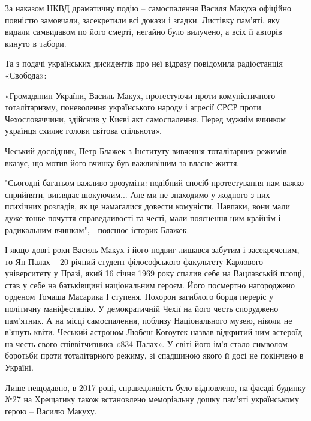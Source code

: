 За наказом НКВД драматичну подію – самоспалення Василя Макуха офіційно повністю
замовчали, засекретили всі докази і згадки. Листівку пам’яті, яку видали
самвидавом по його смерті, негайно було вилучено, а всіх її авторів кинуто в
табори.

Та з подачі українських дисидентів про неї відразу повідомила радіостанція
«Свобода»:

«Громадянин України, Василь Макух, протестуючи проти комуністичного
тоталітаризму, поневолення українського народу і агресії СРСР проти
Чехословаччини, здійснив у Києві акт самоспалення. Перед мужнім вчинком
українця схиляє голови світова спільнота».

Чеський дослідник, Петр Блажек з Інституту вивчення тоталітарних режимів
вказує, що мотив його вчинку був важливішим за власне життя.

"Сьогодні багатьом важливо зрозуміти: подібний спосіб протестування нам важко
сприйняти, виглядає шокуючим... Але ми не знаходимо у жодного з них психічних
розладів, як це намагалися довести комуністи. Навпаки, вони мали дуже тонке
почуття справедливості та честі, мали пояснення цим крайнім і радикальним
вчинкам", - пояснює історик Блажек.

І якщо довгі роки Василь Макух і його подвиг лишався забутим і засекреченим, то
Ян Палах – 20-річний студент філософського факультету Карлового університету у
Празі, який 16 січня 1969 року спалив себе на Вацлавській площі, став у себе на
батьківщині національним героєм. Його посмертно нагороджено орденом Томаша
Масарика І ступеня. Похорон загиблого борця переріс у політичну маніфестацію. У
демократичній Чехії на його честь споруджено пам’ятник. А на місці
самоспалення, поблизу Національного музею, ніколи не в’януть квіти. Чеський
астроном Любеш Когоутек назвав відкритий ним астероїд на честь свого
співвітчизника «834 Палах». У світі його ім’я стало символом боротьби проти
тоталітарного режиму, зі спадщиною якого й досі не покінчено в Україні.

Лише нещодавно, в 2017 році, справедливість було відновлено, на фасаді будинку
№27 на Хрещатику також встановлено меморіальну дошку пам’яті українському герою
– Василю Макуху.

